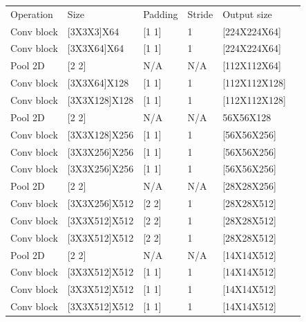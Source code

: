 \documentclass[a4paper]{iacas}
\begin{document}
\begin{table}[]
\begin{tabular}{|l|l|l|l|l|l}
\cline{1-5}
Operation       & Size                   & Padding   & Stride & Output size       &  \\ \cline{1-5}
Conv block      & {[}3X3X3{]}X64         & {[}1 1{]} & 1      & {[}224X224X64{]}  &  \\ \cline{1-5}
Conv block      & {[}3X3X64{]}X64        & {[}1 1{]} & 1      & {[}224X224X64{]}  &  \\ \cline{1-5}
Pool 2D         & {[}2 2{]}              & N/A       & N/A    & {[}112X112X64{]}  &  \\ \cline{1-5}
Conv block      & {[}3X3X64{]}X128       & {[}1 1{]} & 1      & {[}112X112X128{]} &  \\ \cline{1-5}
Conv block      & {[}3X3X128{]}X128      & {[}1 1{]} & 1      & {[}112X112X128{]} &  \\ \cline{1-5}
Pool 2D         & {[}2 2{]}              & N/A       & N/A    & 56X56X128         &  \\ \cline{1-5}
Conv block      & {[}3X3X128{]}X256      & {[}1 1{]} & 1      & {[}56X56X256{]}   &  \\ \cline{1-5}
Conv block      & {[}3X3X256{]}X256      & {[}1 1{]} & 1      & {[}56X56X256{]}   &  \\ \cline{1-5}
Conv block      & {[}3X3X256{]}X256      & {[}1 1{]} & 1      & {[}56X56X256{]}   &  \\ \cline{1-5}
Pool 2D         & {[}2 2{]}              & N/A       & N/A    & {[}28X28X256{]}   &  \\ \cline{1-5}
Conv block      & {[}3X3X256{]}X512      & {[}2 2{]} & 1      & {[}28X28X512{]}   &  \\ \cline{1-5}
Conv block      & {[}3X3X512{]}X512      & {[}2 2{]} & 1      & {[}28X28X512{]}   &  \\ \cline{1-5}
Conv block      & {[}3X3X512{]}X512      & {[}2 2{]} & 1      & {[}28X28X512{]}   &  \\ \cline{1-5}
Pool 2D         & {[}2 2{]}              & N/A       & N/A    & {[}14X14X512{]}   &  \\ \cline{1-5}
Conv block      & {[}3X3X512{]}X512      & {[}1 1{]} & 1      & {[}14X14X512{]}   &  \\ \cline{1-5}
Conv block      & {[}3X3X512{]}X512      & {[}1 1{]} & 1      & {[}14X14X512{]}   &  \\ \cline{1-5}
Conv block      & {[}3X3X512{]}X512      & {[}1 1{]} & 1      & {[}14X14X512{]}   &  \\ \cline{1-5}

\end{tabular}
\end{table}
\end{document}
